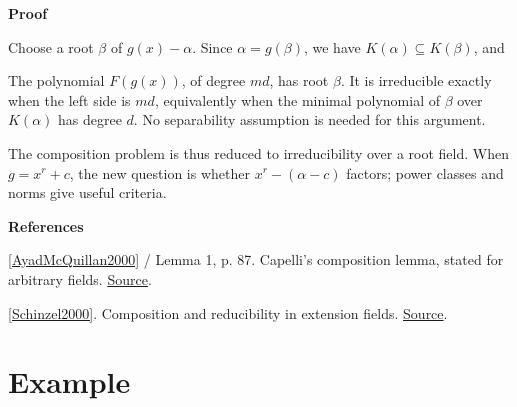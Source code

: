 \documentclass[11pt,a4paper,oneside,openany]{book}
\newcommand{\atlasdisplay}[1]{\par\begingroup\centering\vspace{3pt}\noindent\adjustbox{max width=\linewidth}{\(\displaystyle #1\)}\par\vspace{5pt}\endgroup}
\newenvironment{sources}{\par\smallskip\begingroup\footnotesize\color{atlasgray}\leftskip=10pt\setlength{\parskip}{2pt}}{\par\endgroup\smallskip}
\begin{document}
\begin{atlasblock}[standard]
\textbf{\sffamily Proof}\par\smallskip
\color{black} Choose a root \(\beta\) of \(g(x)-\alpha\). Since \(\alpha=g(\beta)\), we have \(K(\alpha)\subseteq K(\beta)\), and\par

\atlasdisplay{[K(\beta):K]=m\,[K(\beta):K(\alpha)].}
\color{black} The polynomial \(F(g(x))\), of degree \(md\), has root \(\beta\). It is irreducible exactly when the left side is \(md\), equivalently when the minimal polynomial of \(\beta\) over \(K(\alpha)\) has degree \(d\). No separability assumption is needed for this argument.\par
\end{atlasblock}\color{black}

\color{black} The composition problem is thus reduced to irreducibility over a root field. When \(g=x^r+c\), the new question is whether \(x^r-(\alpha-c)\) factors; power classes and norms give useful criteria.\par
\begin{sources}
\textbf{References}\par\smallskip
\noindent\hyperlink{ref:AyadMcQuillan2000}{[AyadMcQuillan2000]} / Lemma 1, p. 87. Capelli's composition lemma, stated for arbitrary fields. \href{https://doi.org/10.4064/aa-93-1-87-97}{Source}.\par
\noindent\hyperlink{ref:Schinzel2000}{[Schinzel2000]}. Composition and reducibility in extension fields. \href{https://doi.org/10.1017/CBO9780511542916}{Source}.\par
\end{sources}\color{black}
\section{Example}
\end{document}
